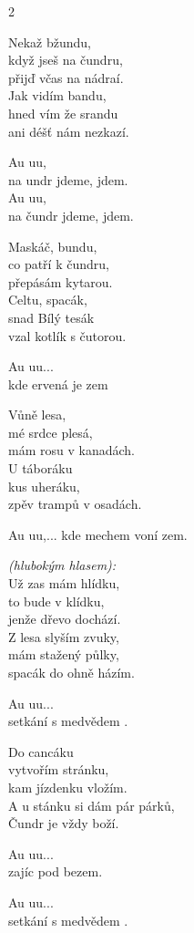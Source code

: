 
\begin{multicols}{2}

\thispagestyle{empty}

\ve{}
Nekaž bžundu,\\
když jseš na čundru,\\
přijď včas na nádraí.\\
Jak vidím bandu,\\
hned vím že srandu\\
ani déšť nám nezkazí.

\cho{}
Au uu,\\
na undr jdeme, jdem.\\
Au uu,\\
na čundr jdeme, jdem.

\ve{}
Maskáč, bundu,\\
co patří k čundru,\\
přepásám kytarou.\\
Celtu, spacák,\\
snad Bílý tesák\\
vzal kotlík s čutorou.

\cho{}
Au uu...\\
kde ervená je zem


\ve{}
Vůně lesa,\\
mé srdce plesá,\\
mám rosu v kanadách.\\
U táboráku\\
kus uheráku,\\
zpěv trampů v osadách.

\cho{}
Au uu,...
kde mechem voní zem.\\

\vfill\columnbreak\vspace*{\fill}

\re{}\textit{(hlubokým hlasem):}\\
\ve{}
Už zas mám hlídku,\\
to bude v klídku,\\
jenže dřevo dochází.\\
Z lesa slyším zvuky,\\
mám stažený půlky,\\
spacák do ohně házím.


\cho{}
Au uu...\\
setkání s medvědem .


\ve{}
Do cancáku\\
vytvořím stránku,\\
kam jízdenku vložím.\\
A u stánku si dám pár párků,\\
Čundr je vždy boží.

\cho{}
Au uu...\\
zajíc pod bezem.

\cho{}
Au uu...\\
setkání s medvědem .
\end{multicols}

\esong{}